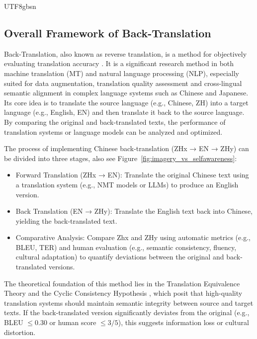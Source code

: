 \documentclass[conference]{IEEEtran}
\begin{document}
\begin{CJK}{UTF8}{gbsn}
\subsection{ Overall Framework of Back-Translation}
Back-Translation, also known as reverse translation, is a method for objectively evaluating translation accuracy \citep{tu2017review,artetxe2018unsupervised, ozolins2020translation}. It is a significant research method in both machine translation (MT) and natural language processing (NLP), especially suited for data augmentation, translation quality assessment and cross-lingual semantic alignment in complex language systems such as Chinese and Japanese. Its core idea is to translate the source language (e.g., Chinese, ZH) into a target language (e.g., English, EN) and then translate it back to the source language. By comparing the original and back-translated texts, the performance of translation systems or language models can be analyzed and optimized.

The process of implementing Chinese back-translation (ZHx → EN → ZHy) can be divided into three stages, also see Figure~\ref{fig:imagery_vs_selfawareness}:
\begin{itemize}
   
 \item Forward Translation (ZHx → EN): Translate the original Chinese text using a translation system (e.g., NMT models or LLMs) to produce an English version.

 \item Back Translation (EN → ZHy): Translate the English text back into Chinese, yielding the back-translated text.

 \item Comparative Analysis: Compare Zhx and ZHy using automatic metrics (e.g., BLEU, TER) and human evaluation (e.g., semantic consistency, fluency, cultural adaptation) to quantify deviations between the original and back-translated versions.

\end{itemize}

The theoretical foundation of this method lies in the Translation Equivalence Theory \citep{nida1964toward} and the Cyclic Consistency Hypothesis \citep{artetxe2018unsupervised}, which posit that high-quality translation systems should maintain semantic integrity between source and target texts. If the back-translated version significantly deviates from the original (e.g., BLEU $\leq 0.30$ or human score $ \leq 3/5$), this suggests information loss or cultural distortion. %


\end{CJK}
\end{document}
